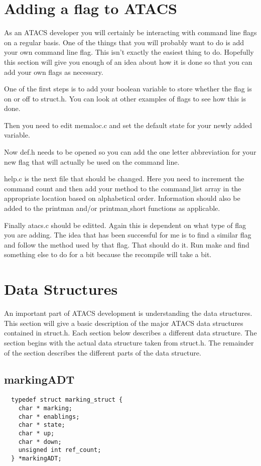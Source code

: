 \documentclass[titlepage,11pt]{article}
\begin{document}
  \section{Adding a flag to ATACS}
  As an ATACS developer you will certainly be interacting with command
  line flags on a regular basis.  One of the things that you will
  probably want to do is add your own command line flag.  This isn't
  exactly the easiest thing to do.  Hopefully this section will give
  you enough of an idea about how it is done so that you can add your
  own flags as necessary.

  One of the first steps is to add your boolean variable to store
  whether the flag is on or off to struct.h.  You can look at other
  examples of flags to see how this is done.

  Then you need to edit memaloc.c and set the default state for your
  newly added variable.

  Now def.h needs to be opened so you can add the one letter
  abbreviation for your new flag that will actually be used on the
  command line.
  
  help.c is the next file that should be changed.  Here you need to
  increment the command count and then add your method to the
  command$\_$list array in the appropriate location based on alphabetical
  order.  Information should also be added to the printman and/or
  printman$\_$short functions as applicable.
  
  Finally atacs.c should be editted.  Again this is dependent on what
  type of flag you are adding.  The idea that has been successful for
  me is to find a similar flag and follow the method used by that
  flag.  That should do it.  Run make and find something else to do
  for a bit because the recompile will take a bit.

  \section{Data Structures}
  An important part of ATACS development is understanding the data
  structures.  This section will give a basic description of the major
  ATACS data structures contained in struct.h.  Each section below
  describes a different data structure.  The section begins with the
  actual data structure taken from struct.h.  The remainder of the
  section describes the different parts of the data structure.

  \subsection{markingADT}
  \begin{verbatim}
  typedef struct marking_struct {
    char * marking;
    char * enablings;
    char * state;
    char * up;
    char * down;
    unsigned int ref_count;
  } *markingADT;
  \end{verbatim}
  
\end{document}
